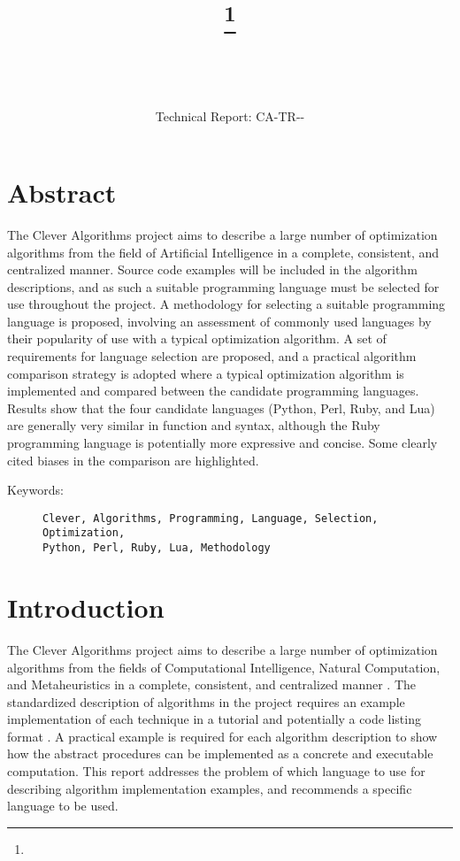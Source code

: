 \documentclass[a4paper, 11pt]{article}
\title{{\myreporttitle}\footnote{\myreportlicense}}
\author{\myreportauthor\\{\myreportemail}\\\small\myreportproject}
\date{\myreportfulldate\\{\small{Technical Report: CA-TR-{\myreportdate}-\myreportversion}}}
\begin{document}
\maketitle

\section*{Abstract} 
The Clever Algorithms project aims to describe a large number of optimization algorithms from the field of Artificial Intelligence in a complete, consistent, and centralized manner.
Source code examples will be included in the algorithm descriptions, and as such a suitable programming language must be selected for use throughout the project.
A methodology for selecting a suitable programming language is proposed, involving an assessment of commonly used languages by their popularity of use with a typical optimization algorithm. A set of requirements for language selection are proposed, and a practical algorithm comparison strategy is adopted where a typical optimization algorithm is implemented and compared between the candidate programming languages. 
Results show that the four candidate languages (Python, Perl, Ruby, and Lua) are generally very similar in function and syntax, although the Ruby programming language is potentially more expressive and concise. Some clearly cited biases in the comparison are highlighted.

\begin{description}
	\item[Keywords:] {\small\texttt{Clever, Algorithms, Programming, Language, Selection, Optimization, \\
	Python, Perl, Ruby, Lua, Methodology}}
\end{description} 

\section{Introduction}
\label{sec:introduction}
The Clever Algorithms project aims to describe a large number of optimization algorithms from the fields of Computational Intelligence, Natural Computation, and Metaheuristics in a complete, consistent, and centralized manner \cite{Brownlee2010}.
The standardized description of algorithms in the project requires an example implementation of each technique in a tutorial and potentially a code listing format \cite{Brownlee2010a}.
A practical example is required for each algorithm description to show how the abstract procedures can be implemented as a concrete and executable computation.
This report addresses the problem of which language to use for describing algorithm implementation examples, and recommends a specific language to be used.
\end{document}
